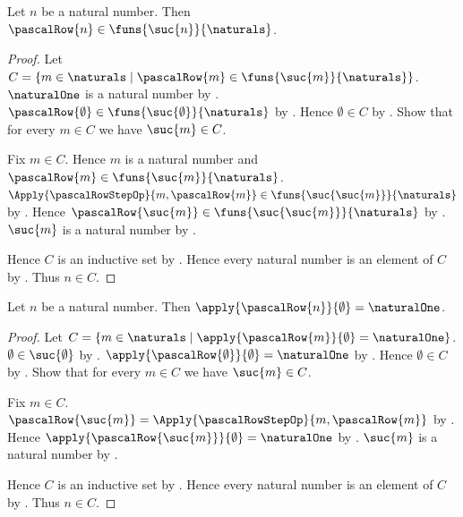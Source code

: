 \begin{theorem}\label{pascal_row_type}
    Let $n$ be a natural number.
    Then $\pascalRow{n}\in\funs{\suc{n}}{\naturals}$.
\end{theorem}
\begin{proof}
    Let $C=\{m\in\naturals\mid
        \pascalRow{m}\in\funs{\suc{m}}{\naturals}\}$.
    $\naturalOne$ is a natural number by
        .
    $\pascalRow{\emptyset}\in
        \funs{\suc{\emptyset}}{\naturals}$ by
        .
    Hence $\emptyset\in C$ by .
    Show that for every $m\in C$ we have $\suc{m}\in C$.
    \begin{subproof}
        Fix $m\in C$.
        Hence $m$ is a natural number and
            $\pascalRow{m}\in\funs{\suc{m}}{\naturals}$.
        $\Apply{\pascalRowStepOp}{m,\pascalRow{m}}
            \in\funs{\suc{\suc{m}}}{\naturals}$ by
            .
        Hence $\pascalRow{\suc{m}}
            \in\funs{\suc{\suc{m}}}{\naturals}$ by
            .
        $\suc{m}$ is a natural number by .
    \end{subproof}
    Hence $C$ is an inductive set by .
    Hence every natural number is an element of $C$ by
        .
    Thus $n\in C$.
\end{proof}

\begin{proposition}\label{pascal_row_first}
    Let $n$ be a natural number.
    Then $\apply{\pascalRow{n}}{\emptyset}=\naturalOne$.
\end{proposition}
\begin{proof}
    Let $C=\{m\in\naturals\mid
        \apply{\pascalRow{m}}{\emptyset}=\naturalOne\}$.
    $\emptyset\in\suc{\emptyset}$ by .
    $\apply{\pascalRow{\emptyset}}{\emptyset}=\naturalOne$ by
        .
    Hence $\emptyset\in C$ by .
    Show that for every $m\in C$ we have $\suc{m}\in C$.
    \begin{subproof}
        Fix $m\in C$.
        $\pascalRow{\suc{m}}
            =\Apply{\pascalRowStepOp}{m,\pascalRow{m}}$ by
            .
        Hence $\apply{\pascalRow{\suc{m}}}{\emptyset}=\naturalOne$ by
            .
        $\suc{m}$ is a natural number by .
    \end{subproof}
    Hence $C$ is an inductive set by .
    Hence every natural number is an element of $C$ by
        .
    Thus $n\in C$.
\end{proof}

